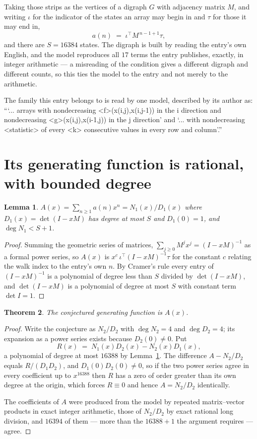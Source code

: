 \documentclass[11pt,a4paper]{article}
\theoremstyle{plain}
\newtheorem{theorem}{Theorem}
\newtheorem{lemma}[theorem]{Lemma}
\theoremstyle{definition}
\begin{document}
Taking those strips as the vertices of a digraph $G$ with adjacency matrix $M$, and writing
$\iota$ for the indicator of the states an array may begin in and $\tau$ for those it may end
in,
\[
a(n)\;=\;\iota^{\!\top}M^{\,n-1+1}\tau ,
\]
and there are $S=16384$ states. The digraph is built by reading the entry's own English, and the
model reproduces all $17$ terms the entry publishes, exactly, in integer arithmetic --- a
misreading of the condition gives a different digraph and different counts, so this ties the
model to the entry and not merely to the arithmetic.

The family this entry belongs to is read by one model, described by its author as: ```... arrays with nondecreasing <f>(x(i,j),x(i,j-1)) in the i direction and nondecreasing <g>(x(i,j),x(i-1,j)) in the j direction' and `... with nondecreasing <statistic> of every <k> consecutive values in every row and column'.''


\section{Its generating function is rational, with bounded degree}

\begin{lemma}\label{lem:rat}
$A(x)=\sum_{n\ge1}a(n)x^n=N_1(x)/D_1(x)$ where $D_1(x)=\det(I-xM)$ has degree at most
$S$ and $D_1(0)=1$, and $\deg N_1<S+1$.
\end{lemma}

\begin{proof}
Summing the geometric series of matrices, $\sum_{j\ge0}M^jx^j=(I-xM)^{-1}$ as a formal
power series, so $A(x)$ is $x^{c}\,\iota^{\!\top}(I-xM)^{-1}\tau$ for the constant $c$
relating the walk index to the entry's own $n$. By Cramer's rule every entry of
$(I-xM)^{-1}$ is a polynomial of degree less than $S$ divided by $\det(I-xM)$, and
$\det(I-xM)$ is a polynomial of degree at most $S$ with constant term $\det I=1$.
\end{proof}

\begin{theorem}
The conjectured generating function is $A(x)$.
\end{theorem}

\begin{proof}
Write the conjecture as $N_2/D_2$ with $\deg N_2=4$ and $\deg D_2=4$; its expansion as a
power series exists because $D_2(0)\neq0$. Put
\[
R(x)\;=\;N_1(x)D_2(x)-N_2(x)D_1(x),
\]
a polynomial of degree at most $16388$ by Lemma~\ref{lem:rat}. The difference
$A-N_2/D_2$ equals $R/(D_1D_2)$, and $D_1(0)D_2(0)\neq0$, so if the two power series agree in
every coefficient up to $x^{16388}$ then $R$ has a zero of order greater than its own
degree at the origin, which forces $R\equiv0$ and hence $A=N_2/D_2$ identically.

The coefficients of $A$ were produced from the model by repeated matrix--vector products in
exact integer arithmetic, those of $N_2/D_2$ by exact rational long division, and $16394$
of them --- more than the $16388+1$ the argument requires --- agree.
\end{proof}
\end{document}
